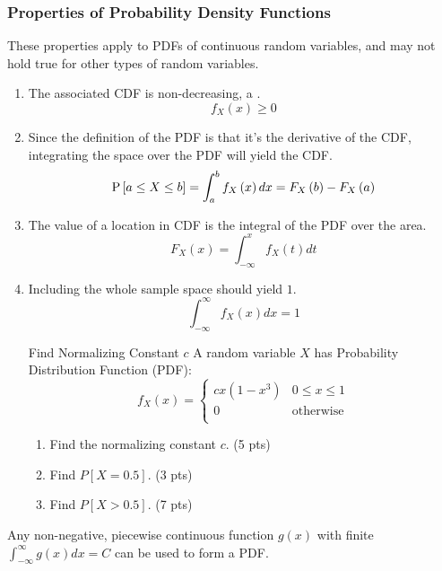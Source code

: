 		\subsubsection{Properties of Probability Density Functions} \label{subsubsec:Properties of Probability Density Functions}
			These properties apply to PDFs of continuous random variables, and may not hold true for other types of random variables.
			\begin{enumerate}[label=\textbf{(\roman*)}, noitemsep, nolistsep]
				\item The associated CDF is non-decreasing, a .
					\begin{equation}
						f_{X} \left( x \right) \geq 0
					\end{equation}
				\item Since the definition of the PDF is that it's the derivative of the CDF, integrating the space over the PDF will yield the CDF.
					\begin{equation}
						\operatorname{\operatorname{P}} \left[ a \leq X \leq b \right] = \int_{a}^{b} f_{X} \left( x \right) dx = F_{X} \left( b \right) - F_{X} \left( a \right)
					\end{equation}
				\item The value of a location in CDF is the integral of the PDF over the area.
					\begin{equation}
						F_{X} \left( x \right) = \int_{-\infty}^{x} f_{X} \left( t \right) dt
					\end{equation}
				\item Including the whole sample space should yield $1$.
					\begin{equation}
						\int_{-\infty}^{\infty} f_{X} \left( x \right) dx = 1
					\end{equation}
					\begin{example}{Find Normalizing Constant $c$}
						A random variable $X$ has Probability Distribution Function (PDF):
						\begin{equation*}
							f_{X}\left( x \right) = \begin{cases}
								cx \left( 1- x^{3} \right) & 0 \leq x \leq 1 \\
								0 & \text{otherwise} \\
								\end{cases}
							\end{equation*}
						\begin{enumerate}
							\item Find the normalizing constant $c$. (5 pts)
							\item Find $P \left[ X = 0.5 \right]$. (3 pts)
							\item Find $P \left[ X > 0.5 \right]$. (7 pts)
						\end{enumerate}
					\end{example}
			\end{enumerate}
			\begin{remark*}
				Any non-negative, piecewise continuous function $g \left( x \right)$ with finite $\int_{-\infty}^{\infty} g \left( x \right) dx = C$ can be used to form a PDF.
			\end{remark*}
		
